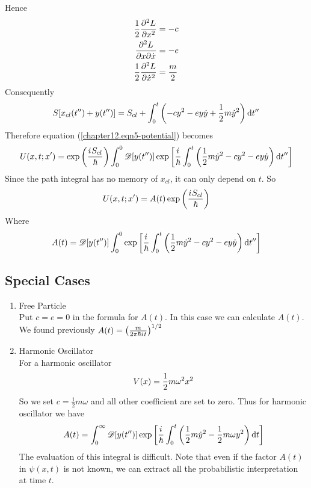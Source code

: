 		Hence
		\begin{align}
			\frac{1}{2} \pdv[2]{L}{x} &= -c \\
			\pdv[2]{L}{x}{\dot{x}} &= -e \\
			\frac{1}{2} \pdv[2]{L}{\dot{x}} &= \frac{m}{2}
		\end{align}
		Consequently
		\begin{equation}
			S\qty[x_{cl}\qty(t^{\prime\prime}) + y\qty(t^{\prime\prime})] = S_{cl} + \int_{0}^{t} \qty(-c y^2 - e y \dot{y} + \frac{1}{2} m \dot{y}^2) \dd{t^{\prime\prime}}
		\end{equation}
		Therefore equation (\ref{chapter12.eqn5-potential}) becomes
		\begin{equation}
			U\qty(x, t; x^\prime) = \exp\qty(\frac{{i\mkern1mu} S_{cl}}{\hbar}) 
			\int_{0}^{0} \mathcal{D}\qty[y\qty(t^{\prime\prime})] 
			\exp\qty[\frac{{i\mkern1mu}}{\hbar}  \int_{0}^{t} \qty(\frac{1}{2} m \dot{y}^2 - cy^2 - e y \dot{y}) \dd{t^{\prime\prime}}]
		\end{equation}
		Since the path integral has no memory of $x_{cl}$, it can only depend on $t$. So
		\begin{equation}
			U\qty(x, t; x^{\prime}) = A\qty(t) \exp\qty(\frac{{i\mkern1mu} S_{cl}}{\hbar})
			\label{chapter12.eqn8a-potential}
		\end{equation}
		Where
		\begin{equation}
			A\qty(t) = \mathcal{D}\qty[y\qty(t^{\prime\prime})] \int_0^0 \exp\qty[\frac{{i\mkern1mu}}{\hbar}  \int_{0}^{t} \qty(\frac{1}{2} m \dot{y}^2 - cy^2 - e y \dot{y}) \dd{t^{\prime\prime}}]
			\label{chapter12.eqn8b-potential}
		\end{equation}	
	
	\subsection{Special Cases}
	\begin{enumerate}
		\item Free Particle\\
			Put $c=e=0$ in the formula for $A(t)$. In this case we can calculate $A(t)$. We found previously $A(t) = \qty(\frac{m}{2\pi \hbar {i\mkern1mu} t})^{1/2}$
			
		\item Harmonic Oscillator \\
			For a harmonic oscillator
			\begin{equation}
				V\qty(x) = \frac{1}{2} m \omega^2 x^2
			\end{equation}
			So we set $c=\frac{1}{2} m \omega$ and all other coefficient are set to zero. Thus for harmonic oscillator we have
			\begin{equation}
				A(t) = \int_{0}^{\infty} \mathcal{D}\qty[y\qty(t^{\prime\prime})]  \exp\qty[\frac{{i\mkern1mu}}{\hbar} \int_{0}^{t} \qty(\frac{1}{2} m \dot{y}^2 - \frac{1}{2} m \omega y^2  ) \dd{t}]
			\end{equation}
			The evaluation of this integral is difficult.
			Note that even if the factor $A(t)$ in $\psi(x, t)$ is not known, we can extract all the probabilistic interpretation at time $t$.
		
		
	\end{enumerate}
		
		
